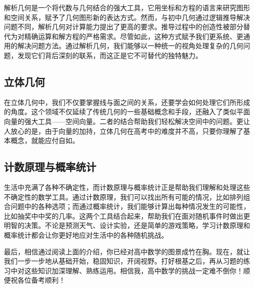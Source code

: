解析几何是一个将代数与几何结合的强大工具，它用坐标和方程的语言来研究图形和空间关系，赋予了几何图形新的表达方式。然而，与初中几何通过逻辑推导解决问题不同，解析几何对计算能力提出了更高的要求。推导过程中的创造性被部分替代为对精确运算和解方程的严格需求。尽管如此，这种方式赋予我们更系统、更通用的解决问题方法。通过解析几何，我们能够以一种统一的视角处理复杂的几何问题，发现它们背后深刻的联系，而这正是它不可替代的独特魅力。


\subsection{立体几何}

在立体几何中，我们不仅要掌握线与面之间的关系，还要学会如何处理它们所形成的角度。这个领域不仅延续了传统几何的一些基础概念和手段，还融入了类似平面向量的强大工具——空间向量。二者的结合帮助我们轻松解决空间中的问题。更让人放心的是，由于向量的加持，立体几何在高考中的难度并不高，只要你理解了基本概念，就能应付自如。

\subsection{计数原理与概率统计}

生活中充满了各种不确定性，而计数原理与概率统计正是帮助我们理解和处理这些不确定性的数学工具。通过计数原理，我们可以找出所有可能的情况，比如排列组合问题中的各种选项；而通过概率统计，我们能够计算出每种情况发生的可能性，比如抽奖中中奖的几率。这两个工具结合起来，帮助我们在面对随机事件时做出更明智的决策。不论是预测天气、设计实验，还是简单的游戏策略，学习计数原理和概率统计都会让你更好地应对生活中的各种随机挑战。

最后，相信通过阅读上面的介绍，你已经对高中数学的图景成竹在胸。现在，就让我们一步一步地从基础开始，稳固知识，开阔视野。打好根基之后，再从习题的练习中对这些知识加深理解、熟练运用。相信我，高中数学的挑战一定难不倒你！顺便祝各位备考顺利！





